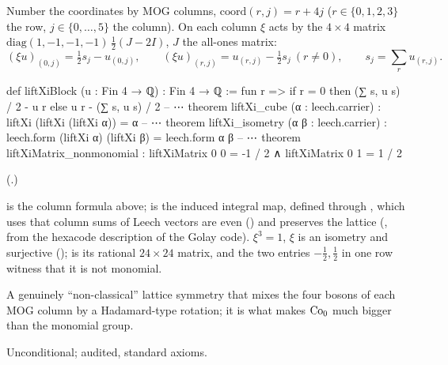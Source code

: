 \begin{definition}[Conway's $\xi$]\label{ch22:def:xi}
Number the coordinates by MOG columns, $\mathrm{coord}(r,j)=r+4j$ ($r\in\{0,1,2,3\}$ the row, $j\in\{0,\dots,5\}$ the
column).  On each column $\xi$ acts by the $4\times4$ matrix $\mathrm{diag}(1,-1,-1,-1)\,\tfrac12(J-2I)$, $J$ the all-ones
matrix:
\begin{equation*}
  (\xi u)_{(0,j)}=\tfrac12 s_j-u_{(0,j)},\qquad (\xi u)_{(r,j)}=u_{(r,j)}-\tfrac12 s_j\ (r\ne0),\qquad
  s_j=\textstyle\sum_{r}u_{(r,j)}.
\end{equation*}
\end{definition}
\begin{leancode}
def liftXiBlock (u : Fin 4 → ℚ) : Fin 4 → ℚ :=
  fun r => if r = 0 then (∑ s, u s) / 2 - u r else u r - (∑ s, u s) / 2
-- ⋯
theorem liftXi_cube (α : leech.carrier) : liftXi (liftXi (liftXi α)) = α
-- ⋯
theorem liftXi_isometry (α β : leech.carrier) :
    leech.form (liftXi α) (liftXi β) = leech.form α β
-- ⋯
theorem liftXiMatrix_nonmonomial :
    liftXiMatrix 0 0 = -1 / 2 ∧ liftXiMatrix 0 1 = 1 / 2
\end{leancode}
(.)
\begin{dictionary}
 is the column formula above;  is the induced
integral map, defined through , which uses that column sums of Leech vectors are even
() and preserves the lattice (, from the hexacode description of the
Golay code).  $\xi^3=1$, $\xi$ is an isometry and surjective ();  is its
rational $24\times24$ matrix, and the two entries $-\tfrac12,\tfrac12$ in one row witness that it is not monomial.
\end{dictionary}
\begin{physics}
A genuinely ``non-classical'' lattice symmetry that mixes the four bosons of each MOG column by a Hadamard-type
rotation; it is what makes $\mathrm{Co}_0$ much bigger than the monomial group.
\end{physics}
\begin{status}Unconditional; audited, standard axioms.\end{status}

